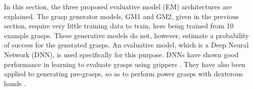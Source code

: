 In this section, the three proposed evaluative model (EM) architectures are explained. The grasp generator models, GM1 and GM2, given in the previous section, require very little training data to train, here being trained from 10 example grasps. %
These generative models do not, however, estimate a probability of success for the generated grasps. An evaluative model, which is a Deep Neural Network (DNN), is used specifically for this purpose. DNNs have shown good performance in learning to evaluate grasps using grippers \cite{levine16,lenz2015deep}. They have also been applied to generating pre-grasps, so as to perform power grasps with dexterous hands \cite{varley2015generating,lu2017planning}.


